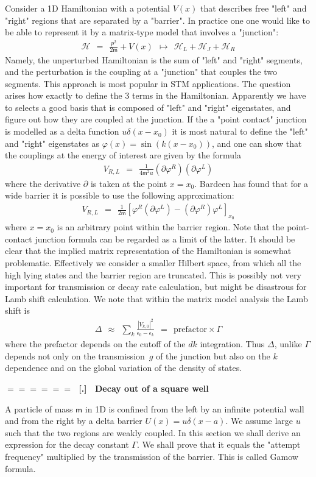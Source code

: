 \documentclass[onecolumn,fleqn]{revtex4}
\newcommand{\mass}{\mathsf{m}}
\newcommand{\beq}{\begin{eqnarray}}
\newcommand{\eeq}{\end{eqnarray}}
\renewcommand{\thesubsection}{\arabic{subsection}}
\renewcommand{\thesubsubsection}{\arabic{subsubsection}}
\newcommand{\sheadC}[1]
{
\addtocounter{subsubsection}{1}
\vspace{5mm}
{\Large\bf $=\!=\!=\!=\!=\!=\;$ [\thesubsection.\thesubsubsection] \ #1}  
\nopagebreak
\phantomsection
}
\begin{document}
Consider a 1D Hamiltonian with a potential $V(x)$ that 
describes free "left" and "right" regions that are 
separated by a "barrier". 
In practice one one would like to be able to represent 
it by a matrix-type model that involves a "junction":
\beq
\mathcal{H} \ \ = \ \ \frac{p^2}{2\mass} + V(x) \ \ \mapsto \ \ \mathcal{H}_L + \mathcal{H}_J +  \mathcal{H}_R
\eeq
Namely, the unperturbed Hamiltonian is the sum of "left" and "right" segments, 
and the perturbation is the coupling at a "junction" that couples the 
two segments. This approach is most popular in STM applications. 
The question arises how exactly to define the 3 terms in the Hamiltonian. 
Apparently we have to selects a good basis that is composed of "left" and "right" eigenstates, 
and figure out how they are coupled at the junction. 
If the a "point contact" junction is modelled as a delta function ${u\delta(x-x_0)}$
it is most natural to define the  "left" and "right" eigenstates 
as ${\varphi(x) = \sin(k(x-x_0))}$, and one can show that the couplings 
at the energy of interest are given by the formula
\beq
V_{R,L} \ \ = \ \ \frac{1}{4\mass^2 u} (\partial \varphi^R)(\partial \varphi^L)
\eeq
where the derivative $\partial$ is taken at the point ${x=x_0}$. 
Bardeen has found that for a wide barrier it is possible to 
use the following approximation:
\beq
V_{R,L} \ \ = \ \ \frac{1}{2\mass} \left[ \varphi^R (\partial \varphi^L) - (\partial \varphi^R) \varphi^L \right]_{x_0} 
\eeq
where ${x=x_0}$ is an arbitrary point within the barrier region. 
Note that the point-contact junction formula can be regarded 
as a limit of the latter. 
It should be clear that the implied matrix representation of the Hamiltonian 
is somewhat problematic. Effectively we consider a smaller Hilbert space, 
from which all the high lying states and the barrier region are truncated.
This is possibly not very important for transmission or decay rate calculation, 
but might be disastrous for Lamb shift calculation. 
We note that within the matrix model analysis the Lamb shift is     
\beq
\Delta \ \ \approx \ \ \sum_k \frac{|V_{k,0}|^2}{\epsilon_0-\epsilon_k} \ \ =  \ \ \text{prefactor} \times \Gamma
\eeq
where the prefactor depends on the cutoff of the $dk$ integration. 
Thus $\Delta$, unlike $\Gamma$ depends not only on the transmission~$g$ 
of the junction but also on the $k$ dependence and on the global variation 
of the density of states.  
 

\newpage
\sheadC{Decay out of a square well}


A particle of mass $\mass$ in 1D is confined from the left 
by an infinite potential wall and from the right 
by a delta barrier $U(x)=u\delta(x-a)$. 
We assume large $u$ such that the two regions 
are weakly coupled. In this section we shall 
derive an expression for the decay constant $\Gamma$. 
We shall prove that it equals the "attempt frequency" 
multiplied by the transmission of the barrier. 
This is called Gamow formula.   
\end{document}
